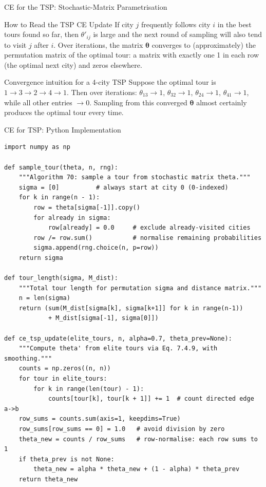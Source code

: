 \documentclass[aspectratio=169,10pt]{beamer}
\newcommand{\btheta}{\boldsymbol{\theta}}
\begin{document}
\begin{frame}[allowframebreaks]{CE for the TSP: Stochastic-Matrix Parametrisation}
\begin{alertblock}{How to Read the TSP CE Update}
  If city $j$ frequently follows city $i$ in the best tours found so far,
  then $\theta'_{ij}$ is large and the next round of sampling will also tend
  to visit $j$ after $i$.  Over iterations, the matrix $\btheta$ converges
  to (approximately) the permutation matrix of the optimal tour: a matrix
  with exactly one 1 in each row (the optimal next city) and zeros
  elsewhere.
\end{alertblock}

\begin{exampleblock}{Convergence intuition for a 4-city TSP}
  Suppose the optimal tour is $1 \to 3 \to 2 \to 4 \to 1$.  Then over
  iterations: $\theta_{13} \to 1$, $\theta_{32} \to 1$, $\theta_{24} \to 1$,
  $\theta_{41} \to 1$, while all other entries $\to 0$.  Sampling from this
  converged $\btheta$ almost certainly produces the optimal tour every time.
\end{exampleblock}

\end{frame}

\begin{frame}[fragile]{CE for TSP: Python Implementation}
  \begin{lstlisting}[style=python,basicstyle=\ttfamily\tiny]
import numpy as np

def sample_tour(theta, n, rng):
    """Algorithm 70: sample a tour from stochastic matrix theta."""
    sigma = [0]          # always start at city 0 (0-indexed)
    for k in range(n - 1):
        row = theta[sigma[-1]].copy()
        for already in sigma:
            row[already] = 0.0     # exclude already-visited cities
        row /= row.sum()           # normalise remaining probabilities
        sigma.append(rng.choice(n, p=row))
    return sigma

def tour_length(sigma, M_dist):
    """Total tour length for permutation sigma and distance matrix."""
    n = len(sigma)
    return (sum(M_dist[sigma[k], sigma[k+1]] for k in range(n-1))
            + M_dist[sigma[-1], sigma[0]])

def ce_tsp_update(elite_tours, n, alpha=0.7, theta_prev=None):
    """Compute theta' from elite tours via Eq. 7.4.9, with smoothing."""
    counts = np.zeros((n, n))
    for tour in elite_tours:
        for k in range(len(tour) - 1):
            counts[tour[k], tour[k + 1]] += 1  # count directed edge a->b
    row_sums = counts.sum(axis=1, keepdims=True)
    row_sums[row_sums == 0] = 1.0   # avoid division by zero
    theta_new = counts / row_sums   # row-normalise: each row sums to 1
    if theta_prev is not None:
        theta_new = alpha * theta_new + (1 - alpha) * theta_prev
    return theta_new
  \end{lstlisting}
\end{frame}
\end{document}
